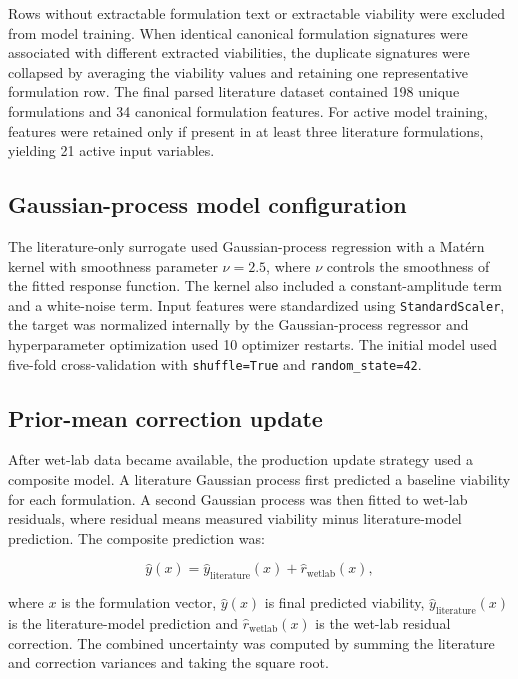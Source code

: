 \documentclass[preprint,12pt]{elsarticle}
\begin{document}
Rows without extractable formulation text or extractable viability were excluded from model training. When identical canonical formulation signatures were associated with different extracted viabilities, the duplicate signatures were collapsed by averaging the viability values and retaining one representative formulation row. The final parsed literature dataset contained 198 unique formulations and 34 canonical formulation features. For active model training, features were retained only if present in at least three literature formulations, yielding 21 active input variables.

\subsection{Gaussian-process model configuration}

The literature-only surrogate used Gaussian-process regression with a Mat\'ern kernel with smoothness parameter \(\nu=2.5\), where \(\nu\) controls the smoothness of the fitted response function. The kernel also included a constant-amplitude term and a white-noise term. Input features were standardized using \texttt{StandardScaler}, the target was normalized internally by the Gaussian-process regressor and hyperparameter optimization used 10 optimizer restarts. The initial model used five-fold cross-validation with \texttt{shuffle=True} and \texttt{random\_state=42}.

\subsection{Prior-mean correction update}

After wet-lab data became available, the production update strategy used a composite model. A literature Gaussian process first predicted a baseline viability for each formulation. A second Gaussian process was then fitted to wet-lab residuals, where residual means measured viability minus literature-model prediction. The composite prediction was:

\begin{equation}
\hat{y}(x)=\hat{y}_{\mathrm{literature}}(x)+\hat{r}_{\mathrm{wetlab}}(x),
\end{equation}

where \(x\) is the formulation vector, \(\hat{y}(x)\) is final predicted viability, \(\hat{y}_{\mathrm{literature}}(x)\) is the literature-model prediction and \(\hat{r}_{\mathrm{wetlab}}(x)\) is the wet-lab residual correction. The combined uncertainty was computed by summing the literature and correction variances and taking the square root.
\end{document}
